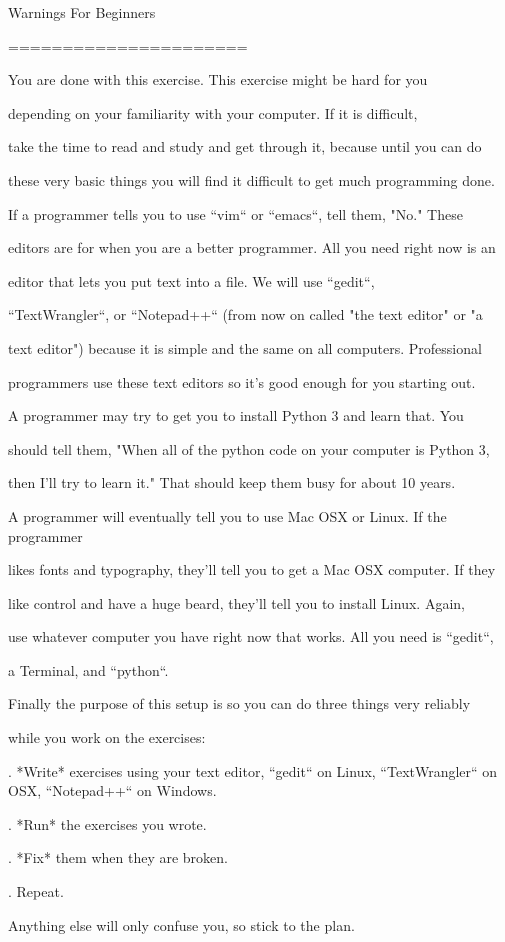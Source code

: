 	
Warnings For Beginners
	
======================
	
	
You are done with this exercise.  This exercise might be hard for you
	
depending on your familiarity with your computer.  If it is difficult,
	
take the time to read and study and get through it, because until you can do
	
these very basic things you will find it difficult to get much programming done.
	
	
If a programmer tells you to use ``vim`` or ``emacs``, tell them, "No."  These
	
editors are for when you are a better programmer.  All you need right now is an
	
editor that lets you put text into a file.  We will use ``gedit``,
	
``TextWrangler``, or ``Notepad++`` (from now on called "the text editor" or "a
	
text editor") because it is simple and the same on all computers.  Professional
	
programmers use these text editors so it's good enough for you starting out.
	
	
A programmer may try to get you to install Python 3 and learn that.  You
	
should tell them, "When all of the python code on your computer is Python 3,
	
then I'll try to learn it."  That should keep them busy for about 10 years.
	
	
A programmer will eventually tell you to use Mac OSX or Linux.  If the programmer
	
likes fonts and typography, they'll tell you to get a Mac OSX computer.  If they
	
like control and have a huge beard, they'll tell you to install Linux.  Again,
	
use whatever computer you have right now that works.  All you need is ``gedit``,
	
a Terminal, and ``python``.
	
	
Finally the purpose of this setup is so you can do three things very reliably
	
while you work on the exercises:
	
	
. *Write* exercises using your text editor, ``gedit`` on Linux, ``TextWrangler`` on OSX, ``Notepad++`` on Windows.
	
. *Run* the exercises you wrote.
	
. *Fix* them when they are broken.
	
. Repeat.
	
	
Anything else will only confuse you, so stick to the plan.